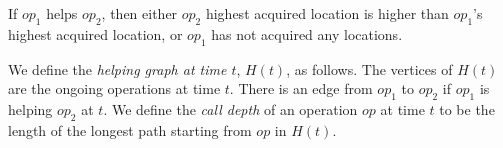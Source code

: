 
\begin{lemma}\label{lemma-higher-highest}
    If $op_1$ helps $op_2$, then either $op_2$ highest acquired location is higher than $op_1$'s highest acquired location, or $op_1$ has not acquired any locations. 
\end{lemma}

We define the {\em helping graph at time $t$}, $H(t)$, as follows. The vertices of $H(t)$ are the ongoing operations at time $t$. There is an edge from $op_1$ to $op_2$ if $op_1$ is helping $op_2$ at $t$. We define the {\em call depth} of an operation $op$ at time $t$ to be the length of the longest path starting from $op$ in $H(t)$.
    
    
